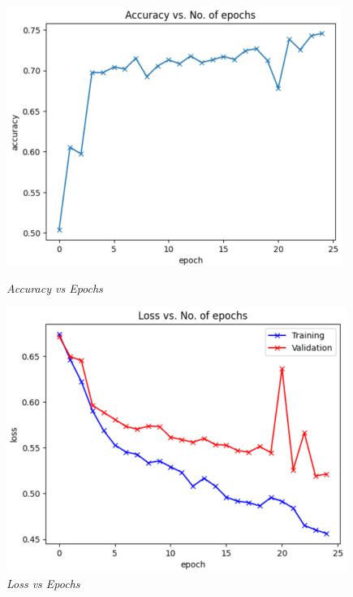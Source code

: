 \documentclass[12pt, a4paper]{report}
\begin{document}
\begin{figure}[htbp]
    \centering
    \begin{minipage}{0.3\textwidth}
        \centering
        \includegraphics[width=\linewidth]{report images/image24.png}
        \caption{\textit{Accuracy vs Epochs}}
    \end{minipage}%
    \hspace{0.03\textwidth} %
    \begin{minipage}{0.3\textwidth}
        \centering
        \includegraphics[width=\linewidth]{report images/image25.png}
        \caption{\textit{Loss vs Epochs}}
    \end{minipage}

\end{figure}
\end{document}
